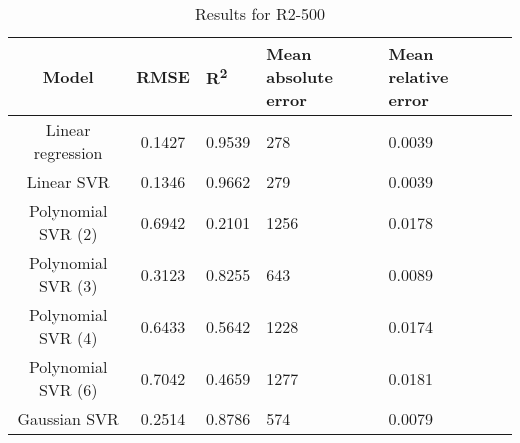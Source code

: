 \begin{table}[H]
\centering
\begin{adjustbox}{center}
\begin{tabular}{c | c M{1.2cm} M{2.5cm} M{2.5cm} M{1.8cm}}
Model & RMSE & R\textsuperscript{2} & Mean absolute error & Mean relative error \tabularnewline
\hline
Linear regression & 0.1427 & 0.9539 &    278 & 0.0039 \\
Linear SVR & 0.1346 & 0.9662 &    279 & 0.0039 \\
Polynomial SVR (2) & 0.6942 & 0.2101 &   1256 & 0.0178 \\
Polynomial SVR (3) & 0.3123 & 0.8255 &    643 & 0.0089 \\
Polynomial SVR (4) & 0.6433 & 0.5642 &   1228 & 0.0174 \\
Polynomial SVR (6) & 0.7042 & 0.4659 &   1277 & 0.0181 \\
Gaussian SVR & 0.2514 & 0.8786 &    574 & 0.0079 \\
\end{tabular}
\end{adjustbox}
\\
\caption{Results for R2-500}
\label{tab:coreonly_linear_R2_500}
\end{table}
